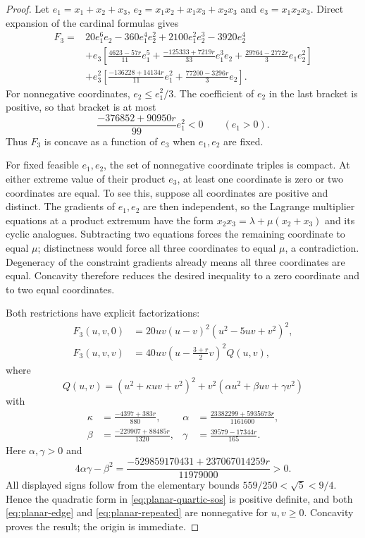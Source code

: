 \documentclass[11pt,a4paper]{article}
\theoremstyle{definition}
\theoremstyle{remark}
\numberwithin{equation}{section}
\begin{document}
\begin{proof}
Let $e_1=x_1+x_2+x_3$, $e_2=x_1x_2+x_1x_3+x_2x_3$ and
$e_3=x_1x_2x_3$.  Direct expansion of the cardinal formulas gives
\begin{equation}\label{eq:planar-elementary}
\begin{split}
 F_3={}&20e_1^6e_2-360e_1^4e_2^2+2100e_1^2e_2^3-3920e_2^4\\
 &+e_3\left[\frac{4623-57r}{11}e_1^5
       +\frac{-125333+7219r}{33}e_1^3e_2
       +\frac{29764-2772r}{3}e_1e_2^2\right]\\
 &+e_3^2\left[\frac{-136228+14134r}{11}e_1^2
       +\frac{77200-3296r}{3}e_2\right].
\end{split}
\end{equation}
For nonnegative coordinates, $e_2\le e_1^2/3$.  The coefficient of
$e_2$ in the last bracket is positive, so that bracket is at most
\[
 \frac{-376852+90950r}{99}e_1^2<0
 \qquad(e_1>0).
\]
Thus $F_3$ is concave as a function of $e_3$ when $e_1,e_2$ are fixed.

For fixed feasible $e_1,e_2$, the set of nonnegative coordinate triples
is compact.  At either extreme value of their product $e_3$, at least
one coordinate is zero or two coordinates are equal.  To see this,
suppose all coordinates are positive and distinct.  The gradients of
$e_1,e_2$ are then independent, so the Lagrange multiplier equations
at a product extremum have the form
$x_2x_3=\lambda+\mu(x_2+x_3)$ and its cyclic analogues.  Subtracting
two equations forces the remaining coordinate to equal $\mu$;
distinctness would force all three coordinates to equal $\mu$, a
contradiction.  Degeneracy of the constraint gradients already means
all three coordinates are equal.  Concavity therefore reduces the
desired inequality to a zero coordinate and to two equal coordinates.

Both restrictions have explicit factorizations:
\begin{align}
 F_3(u,v,0)&=20uv(u-v)^2(u^2-5uv+v^2)^2,
       \label{eq:planar-edge}\\
 F_3(u,v,v)&=40uv\left(u-\frac{3+r}{2}v\right)^2Q(u,v),
       \label{eq:planar-repeated}
\end{align}
where
\begin{equation}\label{eq:planar-quartic-sos}
 Q(u,v)=(u^2+\kappa uv+v^2)^2
          +v^2(\alpha u^2+\beta uv+\gamma v^2)
\end{equation}
with
\begin{align*}
 \kappa&=\frac{-4397+383r}{880},&
 \alpha&=\frac{23382299+5935673r}{1161600},\\
 \beta&=\frac{-229907+88485r}{1320},&
 \gamma&=\frac{39579-17344r}{165}.
\end{align*}
Here $\alpha,\gamma>0$ and
\[
 4\alpha\gamma-\beta^2
   =\frac{-529859170431+237067014259r}{11979000}>0.
\]
All displayed signs follow from the elementary bounds
$559/250<\sqrt5<9/4$.  Hence the quadratic form in
\eqref{eq:planar-quartic-sos} is positive definite, and both
\eqref{eq:planar-edge} and \eqref{eq:planar-repeated} are nonnegative
for $u,v\ge0$.  Concavity proves the result; the origin is immediate.


\end{proof}
\end{document}
